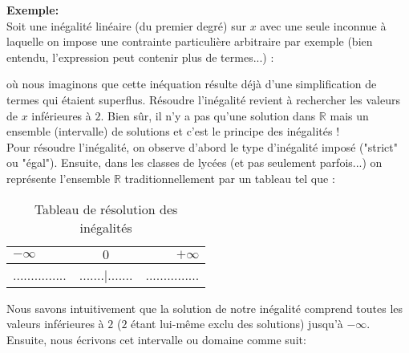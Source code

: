 	\begin{tcolorbox}[colframe=black,colback=white,sharp corners]
\textbf{{\Large {}}Exemple:}\\
	Soit une inégalité linéaire (du premier degré) sur $x$ avec une seule inconnue à laquelle on impose une contrainte particulière arbitraire par exemple (bien entendu, l'expression peut contenir plus de termes...) :
	
	où nous imaginons que cette inéquation résulte déjà d'une simplification de termes qui étaient superflus. Résoudre l'inégalité revient à rechercher les valeurs de $x$ inférieures à $2$. Bien sûr, il n'y a pas qu'une solution dans $\mathbb{R}$ mais un ensemble (intervalle) de solutions et c'est le principe des inégalités !\\
	
	Pour résoudre l'inégalité, on observe d'abord le type d'inégalité imposé ("strict" ou "égal"). Ensuite, dans les classes de lycées (et pas seulement parfois...) on représente l'ensemble $\mathbb{R}$ traditionnellement par un tableau tel que :
	\begin{table}[H]
		\centering
		\begin{tabular}{|l|c|r|}
		\hline 
		{\cellcolor{black!30}$-\infty$} & {\cellcolor{black!30}$0$} & {\cellcolor{black!30}$+\infty$}\\ 
		\hline 
		............... & .......|....... & ............... \\  
		\hline 
		\end{tabular} 
		\caption{Tableau de résolution des inégalités}
	\end{table}
	Nous savons intuitivement que la solution de notre inégalité comprend toutes les valeurs inférieures à $2$ ($2$ étant lui-même exclu des solutions) jusqu'à $-\infty$. Ensuite, nous écrivons cet intervalle ou domaine comme suit:
	

\end{tcolorbox}
